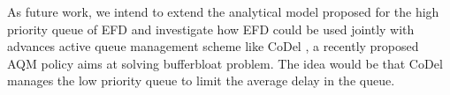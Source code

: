 \documentclass[preprint,12pt]{elsarticle}
\begin{document}
As future work, we intend to extend the analytical model proposed for the high priority queue of EFD and investigate how EFD could be used jointly with advances active queue management scheme like CoDel \cite{Jacobson12}, a recently proposed AQM policy aims at solving bufferbloat problem. The idea would be that CoDel manages the low priority queue to limit the average delay in the queue.














\end{document}
